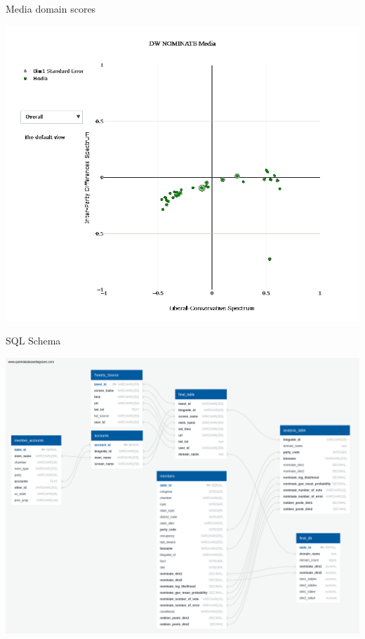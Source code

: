 \documentclass[12pt]{article}
\theoremstyle{example}
\theoremstyle{defn}
\begin{document}
\clearpage

{\large Media domain scores}

\vspace*{-5pt}
\hspace*{\fill}
\includegraphics[scale=0.2]{media_pic_white.png}
\hspace*{\fill}

\clearpage



SQL Schema

\hspace*{\fill}
\includegraphics[scale=0.13]{QuickDBD-Media_Bias_DB.png}
\hspace*{\fill}
\end{document}
